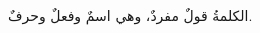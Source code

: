 \documentclass[../main.tex]{subfiles}
\begin{document}
\begin{paracol}{2}

    \begin{english}
        
    \end{english}

    \switchcolumn

    الكلمةُ قولٌ مفردٌ، وهي اسمٌ وفعلٌ وحرفٌ.


\end{paracol}
\end{document}
